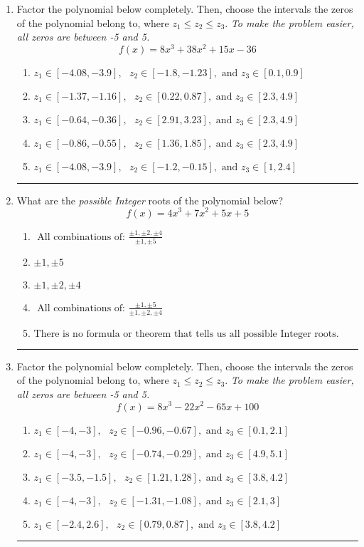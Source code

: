\documentclass[14pt]{extbook}
\newcommand{\litem}[1]{\item#1\hspace*{-1cm}\rule{\textwidth}{0.4pt}}
\begin{document}
\begin{enumerate}
{\begin{enumerate}[label=\Alph*.]
\end{enumerate} }
\litem{
Factor the polynomial below completely. Then, choose the intervals the zeros of the polynomial belong to, where $z_1 \leq z_2 \leq z_3$. \textit{To make the problem easier, all zeros are between -5 and 5.}\[ f(x) = 8x^{3} +38 x^{2} +15 x -36 \]\begin{enumerate}[label=\Alph*.]
\item \( z_1 \in [-4.08, -3.9], \text{   }  z_2 \in [-1.8, -1.23], \text{   and   } z_3 \in [0.1, 0.9] \)
\item \( z_1 \in [-1.37, -1.16], \text{   }  z_2 \in [0.22, 0.87], \text{   and   } z_3 \in [2.3, 4.9] \)
\item \( z_1 \in [-0.64, -0.36], \text{   }  z_2 \in [2.91, 3.23], \text{   and   } z_3 \in [2.3, 4.9] \)
\item \( z_1 \in [-0.86, -0.55], \text{   }  z_2 \in [1.36, 1.85], \text{   and   } z_3 \in [2.3, 4.9] \)
\item \( z_1 \in [-4.08, -3.9], \text{   }  z_2 \in [-1.2, -0.15], \text{   and   } z_3 \in [1, 2.4] \)

\end{enumerate} }
\litem{
What are the \textit{possible Integer} roots of the polynomial below?\[ f(x) = 4x^{3} +7 x^{2} +5 x + 5 \]\begin{enumerate}[label=\Alph*.]
\item \( \text{ All combinations of: }\frac{\pm 1,\pm 2,\pm 4}{\pm 1,\pm 5} \)
\item \( \pm 1,\pm 5 \)
\item \( \pm 1,\pm 2,\pm 4 \)
\item \( \text{ All combinations of: }\frac{\pm 1,\pm 5}{\pm 1,\pm 2,\pm 4} \)
\item \( \text{There is no formula or theorem that tells us all possible Integer roots.} \)

\end{enumerate} }
\litem{
Factor the polynomial below completely. Then, choose the intervals the zeros of the polynomial belong to, where $z_1 \leq z_2 \leq z_3$. \textit{To make the problem easier, all zeros are between -5 and 5.}\[ f(x) = 8x^{3} -22 x^{2} -65 x + 100 \]\begin{enumerate}[label=\Alph*.]
\item \( z_1 \in [-4, -3], \text{   }  z_2 \in [-0.96, -0.67], \text{   and   } z_3 \in [0.1, 2.1] \)
\item \( z_1 \in [-4, -3], \text{   }  z_2 \in [-0.74, -0.29], \text{   and   } z_3 \in [4.9, 5.1] \)
\item \( z_1 \in [-3.5, -1.5], \text{   }  z_2 \in [1.21, 1.28], \text{   and   } z_3 \in [3.8, 4.2] \)
\item \( z_1 \in [-4, -3], \text{   }  z_2 \in [-1.31, -1.08], \text{   and   } z_3 \in [2.1, 3] \)
\item \( z_1 \in [-2.4, 2.6], \text{   }  z_2 \in [0.79, 0.87], \text{   and   } z_3 \in [3.8, 4.2] \)


\end{enumerate}}
\end{enumerate}
\end{document}
